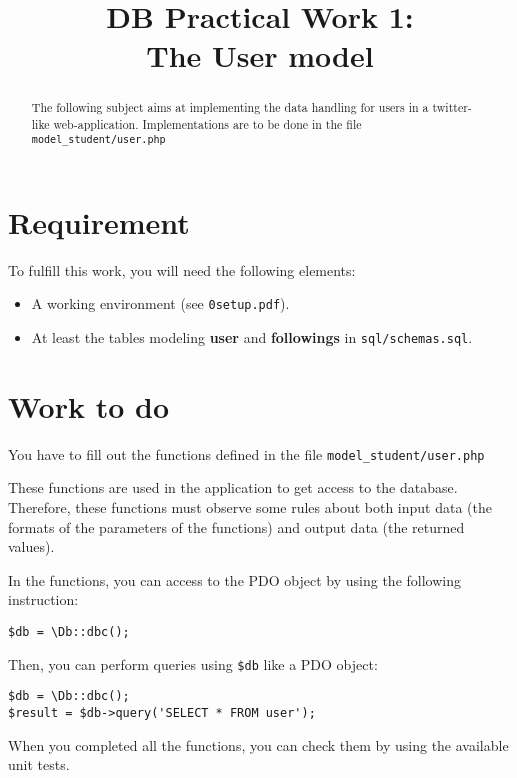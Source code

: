 \documentclass[twoside,a4paper,12pt]{article}
\title{DB Practical Work 1:\\The User model}
\date{}
\begin{document}
\maketitle

\begin{abstract}
  The following subject aims at implementing the data handling for users in a twitter-like web-application. Implementations are to be done in the file \texttt{model\_student/user.php}
\end{abstract}

\tableofcontents

\clearpage

\section{Requirement}
To fulfill this work, you will need the following elements:

\begin{itemize}
\item A working environment (see \texttt{0setup.pdf}).
\item At least the tables modeling \textbf{user} and \textbf{followings} in \texttt{sql/schemas.sql}.
\end{itemize}

\section{Work to do}
You have to fill out the functions defined in the file \texttt{model\_student/user.php}

These functions are used in the application to get access to the database. Therefore, these functions must observe some rules about both input data (the formats of the parameters of the functions) and output data (the returned values).

In the functions, you can access to the PDO object by using the following instruction:

\begin{lstlisting}
$db = \Db::dbc();
\end{lstlisting}

Then, you can perform queries using \texttt{\$db} like a PDO object:
\begin{lstlisting}
$db = \Db::dbc();
$result = $db->query('SELECT * FROM user');
\end{lstlisting}

When you completed all the functions, you can check them by using the available unit tests.
\end{document}
